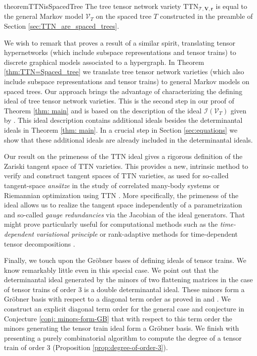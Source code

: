 \documentclass[12pt]{article}
\theoremstyle{definition}
\numberwithin{theorem}{section}
\newcommand{\V}{\mathcal{V}}
\begin{document}
\begin{restatable}{theorem}{TTNisSpacedTree} \label{thm:TTN=Spaced_tree}
The tree tensor network variety $\mathrm{TTN}_{\mathscr{T}, \mathbf{V}, \mathbf{r}}$ is equal to the general Markov model $\V_T$ on the spaced tree $T$ constructed in the preamble of Section \ref{sec:TTN_are_spaced_trees}.
\end{restatable}

We wish to remark that \cite[Theorem 2.1]{RS19} proves a result of a similar spirit, translating tensor hypernetworks (which include subspace representations and tensor trains) to discrete graphical models associated to a hypergraph. In Theorem \ref{thm:TTN=Spaced_tree} we translate tree tensor network varieties (which also include subspace representations and tensor trains) to general Markov models on spaced trees. Our approach brings the advantage of characterizing the defining ideal of tree tensor network varieties.
This is the second step in our proof of Theorem \ref{thm: main} and is based on the description of the ideal $\mathcal{I}(\V_T)$ given by \cite[Theorem 1.7]{DK09}. This ideal description contains additional ideals besides the determinantal ideals in Theorem \ref{thm: main}. In a crucial step in Section \ref{sec:equations} we show that these additional ideals are already included in the determinantal ideals.   

Our result on the primeness of the TTN ideal gives a rigorous definition of the Zariski tangent space of TTN varieties. This provides a new, intrinsic method to verify and construct tangent spaces of TTN varieties, as used for so-called tangent-space \emph{ans\"atze} in the study of correlated many-body systems \cite{Bauernfeind_2020, Haegeman_2011} or Riemannian optimization using TTN \cite{willner2025}. More specifically, the primeness of the ideal allows us to realize the tangent space independently of a parametrization and so-called \emph{gauge redundancies} via the Jacobian of the ideal generators. That might prove particularly useful for computational methods such as the \emph{time-dependent variational principle}  \cite{Bauernfeind_2020, Haegeman_2016, schmidt2026} or rank-adaptive methods for time-dependent tensor decompositions \cite{ceruti2020}.

Finally, we touch upon the Gr\"obner bases of defining ideals of tensor trains. We know remarkably little even in this special case. We point out that the determinantal ideal generated by the minors of two flattening matrices in the case of tensor trains of order $3$ is a double determinantal ideal. These minors form a Gr\"obner basis with respect to a diagonal term order as proved in \cite{FK20} and \cite{illian2025grobner}. We construct an explicit diagonal term order for the general case and conjecture in Conjecture \ref{conj: minors-form-GB} that with respect to this term order the minors generating the tensor train ideal form a Gr\"obner basis. We finish with presenting a purely combinatorial algorithm to compute the degree of a tensor train of order $3$ (Proposition \ref{prop:degree-of-order-3}).  
 
\end{document}
